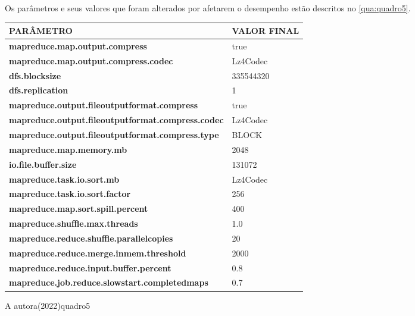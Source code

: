 
Os parâmetros e seus valores que foram alterados por afetarem o desempenho estão descritos no \autoref{qua:quadro5}.

{\footnotesize
  \centering
  \begin{tabular}{|p{80mm}|p{25mm}|}\hline
    \textbf{PARÂMETRO}                                        & \textbf{VALOR FINAL} \\\hline
    \textbf{mapreduce.map.output.compress}                    & true                 \\\hline
    \textbf{mapreduce.map.output.compress.codec}              & Lz4Codec             \\\hline
    \textbf{dfs.blocksize}                                    & 335544320            \\\hline
    \textbf{dfs.replication}                                  & 1                    \\\hline
    \textbf{mapreduce.output.fileoutputformat.compress}       & true                 \\\hline
    \textbf{mapreduce.output.fileoutputformat.compress.codec} & Lz4Codec             \\\hline
    \textbf{mapreduce.output.fileoutputformat.compress.type}  & BLOCK                \\\hline
    \textbf{mapreduce.map.memory.mb}                          & 2048                 \\\hline
    \textbf{io.file.buffer.size}                              & 131072               \\\hline
    \textbf{mapreduce.task.io.sort.mb}                        & Lz4Codec             \\\hline
    \textbf{mapreduce.task.io.sort.factor}                    & 256                  \\\hline
    \textbf{mapreduce.map.sort.spill.percent}                 & 400                  \\\hline
    \textbf{mapreduce.shuffle.max.threads}                    & 1.0                  \\\hline
    \textbf{mapreduce.reduce.shuffle.parallelcopies}          & 20                   \\\hline
    \textbf{mapreduce.reduce.merge.inmem.threshold}           & 2000                 \\\hline
    \textbf{mapreduce.reduce.input.buffer.percent}            & 0.8                  \\\hline
    \textbf{mapreduce.job.reduce.slowstart.completedmaps}     & 0.7                  \\\hline
  \end{tabular}}
{A autora(2022)}{quadro5}{}{}

